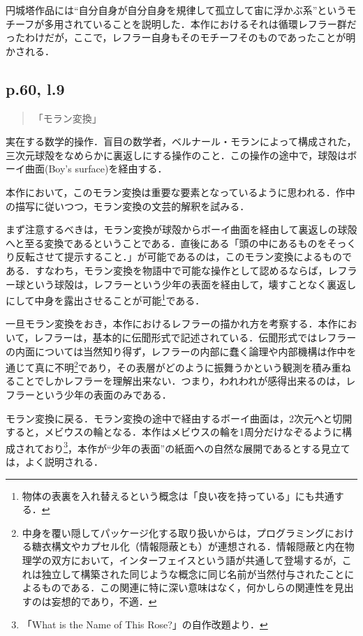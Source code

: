 \documentclass[10pt, a5paper, twoside]{jsarticle}
\theoremstyle{definition}
\begin{document}
                円城塔作品には“自分自身が自分自身を規律して孤立して宙に浮かぶ系”というモチーフが多用されていることを説明した．本作におけるそれは循環レフラー群だったわけだが，ここで，レフラー自身もそのモチーフそのものであったことが明かされる．

            \subsection{p.60, l.9}

                \begin{quote}

                    「モラン変換」

                \end{quote}

                実在する数学的操作．盲目の数学者，ベルナール・モランによって構成された，三次元球殻をなめらかに裏返しにする操作のこと．この操作の途中で，球殻はボーイ曲面(Boy's surface)を経由する．

                本作において，このモラン変換は重要な要素となっているように思われる．作中の描写に従いつつ，モラン変換の文芸的解釈を試みる．

                まず注意するべきは，モラン変換が球殻からボーイ曲面を経由して裏返しの球殻へと至る変換であるということである．直後にある「頭の中にあるものをそっくり反転させて提示すること．」が可能であるのは，このモラン変換によるものである．すなわち，モラン変換を物語中で可能な操作として認めるならば，レフラー球という球殻は，レフラーという少年の表面を経由して，壊すことなく裏返しにして中身を露出させることが可能\footnote{物体の表裏を入れ替えるという概念は「良い夜を持っている」にも共通する．}である．

                一旦モラン変換をおき，本作におけるレフラーの描かれ方を考察する．本作において，レフラーは，基本的に伝聞形式で記述されている．伝聞形式ではレフラーの内面については当然知り得ず，レフラーの内部に蠢く論理や内部機構は作中を通じて真に不明\footnote{中身を覆い隠してパッケージ化する取り扱いからは，プログラミングにおける糖衣構文やカプセル化（情報隠蔽とも）が連想される．情報隠蔽と内在物理学の双方において，インターフェイスという語が共通して登場するが，これは独立して構築された同じような概念に同じ名前が当然付与されたことによるものである．この関連に特に深い意味はなく，何かしらの関連性を見出すのは妄想的であり，不適．}であり，その表層がどのように振舞うかという観測を積み重ねることでしかレフラーを理解出来ない．つまり，われわれが感得出来るのは，レフラーという少年の表面のみである．

                モラン変換に戻る．モラン変換の途中で経由するボーイ曲面は，2次元へと切開すると，メビウスの輪となる．本作はメビウスの輪を1周分だけなぞるように構成されており\footnote{「What is the Name of This Rose?」の自作改題より．}，本作が“少年の表面”の紙面への自然な展開であるとする見立ては，よく説明される．
\end{document}
